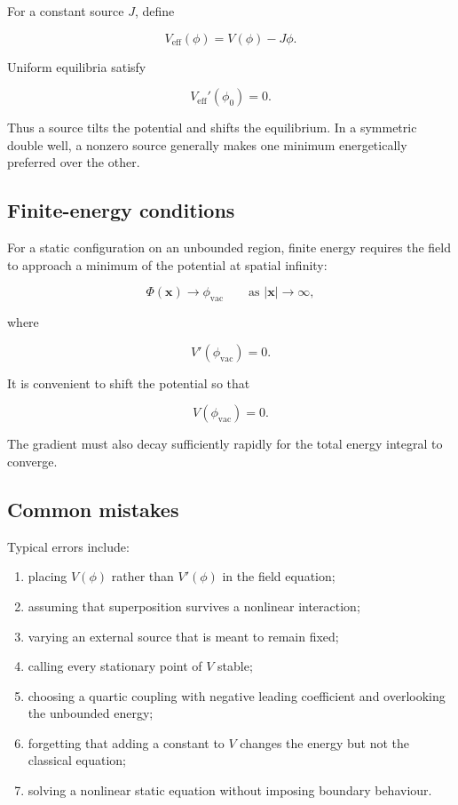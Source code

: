 For a constant source \(J\), define

\[
\boxed{
V_{\mathrm{eff}}(\phi)
=
V(\phi)-J\phi
}.
\]

Uniform equilibria satisfy

\[
V_{\mathrm{eff}}'(\phi_{0})=0.
\]

Thus a source tilts the potential and shifts the equilibrium. In a symmetric double well, a nonzero source generally makes one minimum energetically preferred over the other.

\subsection{Finite-energy conditions}

For a static configuration on an unbounded region, finite energy requires the field to approach a minimum of the potential at spatial infinity:

\[
\Phi(\mathbf{x})
\longrightarrow
\phi_{\mathrm{vac}}
\qquad
\text{as }|\mathbf{x}|\to\infty,
\]

where

\[
V'(\phi_{\mathrm{vac}})=0.
\]

It is convenient to shift the potential so that

\[
V(\phi_{\mathrm{vac}})=0.
\]

The gradient must also decay sufficiently rapidly for the total energy integral to converge.

\subsection{Common mistakes}

Typical errors include:

\begin{enumerate}
    \item placing \(V(\phi)\) rather than \(V'(\phi)\) in the field equation;
    \item assuming that superposition survives a nonlinear interaction;
    \item varying an external source that is meant to remain fixed;
    \item calling every stationary point of \(V\) stable;
    \item choosing a quartic coupling with negative leading coefficient and overlooking the unbounded energy;
    \item forgetting that adding a constant to \(V\) changes the energy but not the classical equation;
    \item solving a nonlinear static equation without imposing boundary behaviour.
\end{enumerate}

